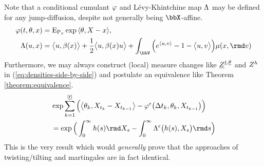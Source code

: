 \begin{remark}
  Note that a conditional cumulant $\varphi$ and L\'evy-Khintchine map $\Lambda$ may be defined for any jump-diffusion, despite not generally being $\stateSpace$-affine.
  \begin{align*}
    \affShift(t, \twistVar, \stateVar) &= \Exp_{\Prb_\stateVar}\exp\prj{\twistVar}{\X-\stateVar}, \\
    \ode(\momentVar, \stateVar) &= \bprj{\momentVar}{\affDrift(\stateVar)} + \frac12\bprj{\momentVar}{\affDrift(\stateVar)\momentVar} + \int_\vecSpace \Big( e^\prj{\momentVar}{\markVar} - 1 - \bprj{\momentVar}{\markVar} \Big) \affJump(\stateVar, \rmd\markVar)
  \end{align*}
  Furthermore, we may always construct (local) measure changes like $\underline{Z}^{\underline t, \underline{\theta}}$ and $Z^{h}$ in (\ref{eq:densities-side-by-side}) and postulate an equivalence like Theorem \ref{theorem:equivalence}.
  \begin{align*}
    &\exp \sum_{k=1}^{|\underline t|}\Big( \bprj{\twistVar_k}{\X_{t_k}-\X_{t_{k-1}}} - \affShift^\epsilon\big(\Delta t_k, \twistVar_k, \X_{t_{k-1}} \big) \Big)  \\
    &= \exp\Big( \int_0^\infty \twistFunc(s) \rmd \X_s - \int_0^\infty \ode^\epsilon\big(\twistFunc(s), \X_s\big) \rmd s \Big)
  \end{align*}
  This is the very result which would \emph{generally} prove that the approaches of twisting/tilting and martingales are in fact identical.
\end{remark}

